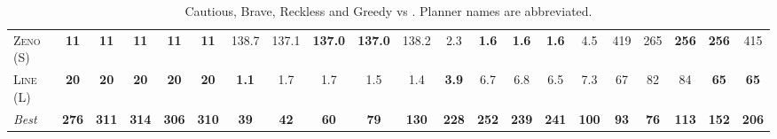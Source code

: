 \begin{table}[tb]
{\begin{tabular}{|l||ccccc||ccccc||ccccc||ccccc||}
\textsc{Zeno} (S)&\textbf{11}&\textbf{11}&\textbf{11}&\textbf{11}&\textbf{11}&138.7&137.1&\textbf{137.0}&\textbf{137.0}&138.2&2.3&\textbf{1.6}&\textbf{1.6}&\textbf{1.6}&4.5&419&265&\textbf{256}&\textbf{256}&415\\
\textsc{Line} (L)&\textbf{20}&\textbf{20}&\textbf{20}&\textbf{20}&\textbf{20}&\textbf{1.1}&1.7&1.7&1.5&1.4&\textbf{3.9}&6.7&6.8&6.5&7.3&67&82&84&\textbf{65}&\textbf{65}
\\\hline
\textit{Best}&\textbf{276}&\textbf{311}&\textbf{314}&\textbf{306}&\textbf{310}&\textbf{39}&\textbf{42}&\textbf{60}&\textbf{79}&\textbf{130}&\textbf{228}&\textbf{252}&\textbf{239}&\textbf{241}&\textbf{100}&\textbf{93}&\textbf{76}&\textbf{113}&\textbf{152}&\textbf{206}\\\hline

        \end{tabular}}
        \caption{Cautious, Brave, Reckless and Greedy \pattyd vs \pattyo. Planner names are abbreviated.}
        \label{tab:cbrg}
        \end{table}
        